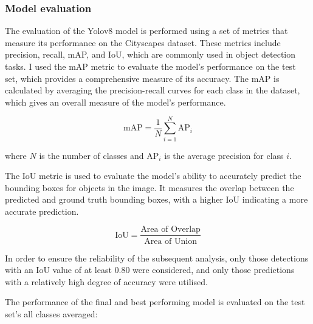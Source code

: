 \subsubsection{Model evaluation}\label{subsubsec:model-evaluation}
The evaluation of the Yolov8 model is performed using a set of metrics that measure its performance on the Cityscapes dataset.
These metrics include precision, recall, mAP, and IoU, which are commonly used in object detection tasks.
I used the mAP metric to evaluate the model's performance on the test set, which provides a comprehensive measure of its accuracy.
The mAP is calculated by averaging the precision-recall curves for each class in the dataset, which gives an overall measure of the model's performance.

\begin{equation}
\text{mAP} = \frac{1}{N} \sum_{i=1}^{N} \text{AP}_i
\end{equation}


where \( N \) is the number of classes and \( \text{AP}_i \) is the average precision for class \( i \).

The IoU metric is used to evaluate the model's ability to accurately predict the bounding boxes for objects in the image.
It measures the overlap between the predicted and ground truth bounding boxes, with a higher IoU indicating a more accurate prediction.

\begin{equation}
\text{IoU} = \frac{\text{Area of Overlap}}{\text{Area of Union}}
\end{equation}


In order to ensure the reliability of the subsequent analysis, only those detections with an IoU value of at least 0.80 were considered,
and only those predictions with a relatively high degree of accuracy were utilised.

The performance of the final and best performing model is evaluated on the test set's all classes averaged:



